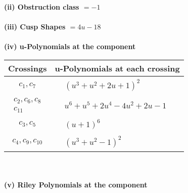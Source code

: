 \documentclass[1p]{elsarticle_modified}
\theoremstyle{definition}
\begin{document}
\flushleft \textbf{(ii) Obstruction class $= -1$}\\~\\
\flushleft \textbf{(iii) Cusp Shapes $= 4 u-18$}\\~\\
\newpage\renewcommand{\arraystretch}{1}
\flushleft \textbf{(iv) u-Polynomials at the component}\newline \\
\begin{tabular}{m{50pt}|m{274pt}}
Crossings & \hspace{64pt}u-Polynomials at each crossing \\
\hline $$\begin{aligned}c_{1},c_{7}\end{aligned}$$&$\begin{aligned}
&(u^3+u^2+2 u+1)^2
\end{aligned}$\\
\hline $$\begin{aligned}c_{2},c_{6},c_{8}\\c_{11}\end{aligned}$$&$\begin{aligned}
&u^6+u^5+2 u^4-4 u^2+2 u-1
\end{aligned}$\\
\hline $$\begin{aligned}c_{3},c_{5}\end{aligned}$$&$\begin{aligned}
&(u+1)^6
\end{aligned}$\\
\hline $$\begin{aligned}c_{4},c_{9},c_{10}\end{aligned}$$&$\begin{aligned}
&(u^3+u^2-1)^2
\end{aligned}$\\
\hline
\end{tabular}\\~\\
\newpage\renewcommand{\arraystretch}{1}
\flushleft \textbf{(v) Riley Polynomials at the component}\newline \\
\end{document}
